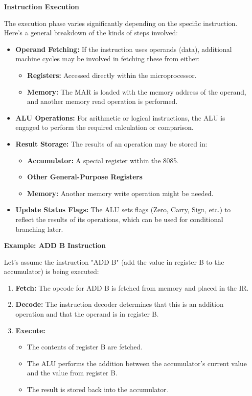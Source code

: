 \documentclass[
]{article}
\begin{document}
\textbf{Instruction Execution}

The execution phase varies significantly depending on the specific
instruction. Here's a general breakdown of the kinds of steps involved:

\begin{itemize}
\item
  \textbf{Operand Fetching:} If the instruction uses operands (data),
  additional machine cycles may be involved in fetching these from
  either:

  \begin{itemize}
  \item
    \textbf{Registers:} Accessed directly within the microprocessor.
  \item
    \textbf{Memory:} The MAR is loaded with the memory address of the
    operand, and another memory read operation is performed.
  \end{itemize}
\item
  \textbf{ALU Operations:} For arithmetic or logical instructions, the
  ALU is engaged to perform the required calculation or comparison.
\item
  \textbf{Result Storage:} The results of an operation may be stored in:

  \begin{itemize}
  \item
    \textbf{Accumulator:} A special register within the 8085.
  \item
    \textbf{Other General-Purpose Registers}
  \item
    \textbf{Memory:} Another memory write operation might be needed.
  \end{itemize}
\item
  \textbf{Update Status Flags:} The ALU sets flags (Zero, Carry, Sign,
  etc.) to reflect the results of its operations, which can be used for
  conditional branching later.
\end{itemize}

\textbf{Example: ADD B Instruction}

Let's assume the instruction "ADD B" (add the value in register B to the
accumulator) is being executed:

\begin{enumerate}
\def\labelenumi{\arabic{enumi}.}
\item
  \textbf{Fetch:} The opcode for ADD B is fetched from memory and placed
  in the IR.
\item
  \textbf{Decode:} The instruction decoder determines that this is an
  addition operation and that the operand is in register B.
\item
  \textbf{Execute:}

  \begin{itemize}
  \item
    The contents of register B are fetched.
  \item
    The ALU performs the addition between the accumulator's current
    value and the value from register B.
  \item
    The result is stored back into the accumulator.
  \end{itemize}
\end{enumerate}
\end{document}
